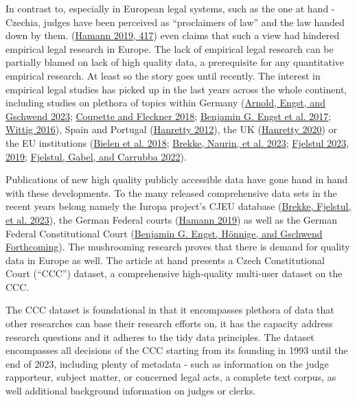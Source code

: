 \documentclass[
  11pt,
]{article}
\begin{document}
In contrast to, especially in European legal systems, such as the one at
hand - Czechia, judges have been perceived as ``proclaimers of law'' and
the law handed down by them.
(\protect\hyperlink{ref-hamannGermanFederalCourts2019}{Hamann 2019,
417}) even claims that such a view had hindered empirical legal research
in Europe. The lack of empirical legal research can be partially blamed
on lack of high quality data, a prerequisite for any quantitative
empirical research. At least so the story goes until recently. The
interest in empirical legal studies has picked up in the last years
across the whole continent, including studies on plethora of topics
within Germany
(\protect\hyperlink{ref-arnoldScalingCourtDecisions2023}{Arnold, Engst,
and Gschwend 2023};
\protect\hyperlink{ref-coupetteQuantitativeRechtswissenschaft2018}{Coupette
and Fleckner 2018};
\protect\hyperlink{ref-engstEinflussParteinaheAuf2017}{Benjamin G. Engst
et al. 2017};
\protect\hyperlink{ref-wittigOccurrenceSeparateOpinions2016}{Wittig
2016}), Spain and Portugal
(\protect\hyperlink{ref-hanrettyDissentIberiaIdeal2012}{Hanretty 2012}),
the UK
(\protect\hyperlink{ref-hanrettyCourtSpecialistsJudicial2020}{Hanretty
2020}) or the EU institutions
(\protect\hyperlink{ref-bielenBacklogsLitigationRates2018}{Bielen et al.
2018}; \protect\hyperlink{ref-brekkeThatOrderHow2023}{Brekke, Naurin, et
al. 2023}; \protect\hyperlink{ref-fjelstulHowChamberSystem2023}{Fjelstul
2023}, \protect\hyperlink{ref-fjelstulEvolutionEuropeanUnion2019}{2019};
\protect\hyperlink{ref-fjelstulTimelyAdministrationJustice2022}{Fjelstul,
Gabel, and Carrubba 2022}).

Publications of new high quality publicly accessible data have gone hand
in hand with these developments. To the many released comprehensive data
sets in the recent years belong namely the Iuropa project's CJEU
database (\protect\hyperlink{ref-brekkeCJEUDatabasePlatform2023}{Brekke,
Fjelstul, et al. 2023}), the German Federal courts
(\protect\hyperlink{ref-hamannGermanFederalCourts2019}{Hamann 2019}) as
well as the German Federal Constitutional Court
(\protect\hyperlink{ref-engstConstitutionalCourtDatabaseForthcoming}{Benjamin
G. Engst, Hönnige, and Gschwend Forthcoming}). The mushrooming research
proves that there is demand for quality data in Europe as well. The
article at hand presents a Czech Constitutional Court (``CCC'') dataset,
a comprehensive high-quality multi-user dataset on the CCC.

The CCC dataset is foundational in that it encompasses plethora of data
that other researches can base their research efforts on, it has the
capacity address research questions and it adheres to the tidy data
principles. The dataset encompasses all decisions of the CCC starting
from its founding in 1993 until the end of 2023, including plenty of
metadata - such as information on the judge rapporteur, subject matter,
or concerned legal acts, a complete text corpus, as well additional
background information on judges or clerks.
\end{document}
